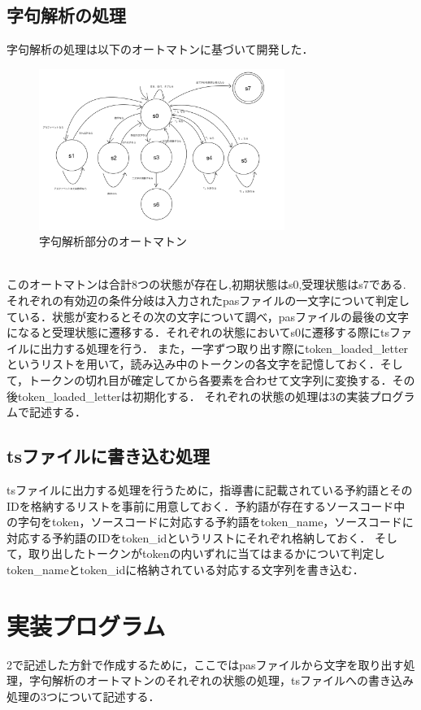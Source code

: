 \documentclass[dvipdfmx]{jarticle}
\begin{document}
\subsection{字句解析の処理}
字句解析の処理は以下のオートマトンに基づいて開発した．
\begin{figure}[h]
    \centering
    \includegraphics[width = 8cm, angle = -90]{automaton.png}
    \caption{字句解析部分のオートマトン}
\end{figure}
\\このオートマトンは合計8つの状態が存在し,初期状態はs0,受理状態はs7である.それぞれの有効辺の条件分岐は入力されたpasファイルの一文字について判定している．状態が変わるとその次の文字について調べ，pasファイルの最後の文字になると受理状態に遷移する．それぞれの状態においてs0に遷移する際にtsファイルに出力する処理を行う．
また，一字ずつ取り出す際にtoken\_loaded\_letterというリストを用いて，読み込み中のトークンの各文字を記憶しておく．そして，トークンの切れ目が確定してから各要素を合わせて文字列に変換する．その後token\_loaded\_letterは初期化する．
それぞれの状態の処理は3の実装プログラムで記述する．
\subsection{tsファイルに書き込む処理}
tsファイルに出力する処理を行うために，指導書に記載されている予約語とそのIDを格納するリストを事前に用意しておく．予約語が存在するソースコード中の字句をtoken，ソースコードに対応する予約語をtoken\_name，ソースコードに対応する予約語のIDをtoken\_idというリストにそれぞれ格納しておく．
そして，取り出したトークンがtokenの内いずれに当てはまるかについて判定しtoken\_nameとtoken\_idに格納されている対応する文字列を書き込む．
\section{実装プログラム}
2で記述した方針で作成するために，ここではpasファイルから文字を取り出す処理，字句解析のオートマトンのそれぞれの状態の処理，tsファイルへの書き込み処理の3つについて記述する．
\end{document}
